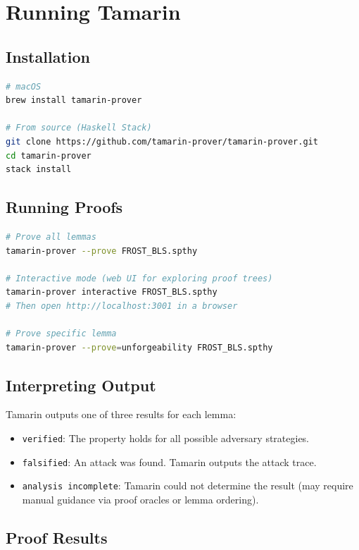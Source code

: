 \documentclass[11pt,a4paper]{article}
\begin{document}
\section{Running Tamarin}

\subsection{Installation}

\begin{lstlisting}[language=bash,caption={Installing Tamarin}]
# macOS
brew install tamarin-prover

# From source (Haskell Stack)
git clone https://github.com/tamarin-prover/tamarin-prover.git
cd tamarin-prover
stack install
\end{lstlisting}

\subsection{Running Proofs}

\begin{lstlisting}[language=bash,caption={Running Tamarin}]
# Prove all lemmas
tamarin-prover --prove FROST_BLS.spthy

# Interactive mode (web UI for exploring proof trees)
tamarin-prover interactive FROST_BLS.spthy
# Then open http://localhost:3001 in a browser

# Prove specific lemma
tamarin-prover --prove=unforgeability FROST_BLS.spthy
\end{lstlisting}

\subsection{Interpreting Output}

Tamarin outputs one of three results for each lemma:
\begin{itemize}[nosep]
  \item \texttt{verified}: The property holds for all possible adversary strategies.
  \item \texttt{falsified}: An attack was found. Tamarin outputs the attack trace.
  \item \texttt{analysis incomplete}: Tamarin could not determine the result (may require
    manual guidance via proof oracles or lemma ordering).
\end{itemize}

\subsection{Proof Results}
\end{document}
